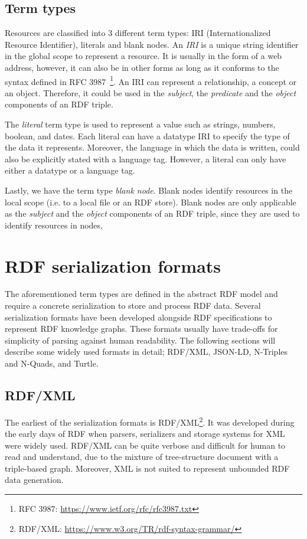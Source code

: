 \subsection{Term types}
Resources are classified into 3 different term types: IRI (Internationalized Resource Identifier),
literals and blank nodes. An \textit{IRI} is a unique string identifier in the global scope to
represent a resource. It is usually in the form of a web address, however, it can
also be in other forms as long as it conforms to the syntax defined in
RFC 3987~\footnote{RFC 3987: \url{https://www.ietf.org/rfc/rfc3987.txt}}.
An IRI can represent a relationship, a concept or an object. Therefore, it could be
used in the \textit{subject}, the \textit{predicate} and the \textit{object} components of
an RDF triple.

The \textit{literal} term type is used to represent a value such as strings, numbers, boolean, and dates.
Each literal can have a datatype IRI to specify the type of the data it represents. Moreover, the
language in which the data is written, could also be explicitly stated with
a language tag. However, a literal can only have either a datatype or a language tag. 

Lastly, we have the term type \textit{blank node}. Blank nodes identify resources
in the local scope (i.e. to a local file or an RDF store).
Blank nodes are only applicable as the \textit{subject}
and the \textit{object} components of an RDF triple, since they are used to
identify resources in nodes,


\section{RDF serialization formats}

The aforementioned term types are defined in the abstract RDF model and 
require a concrete serialization to store and process RDF data. 
Several serialization formats have been developed alongside RDF specifications to represent RDF
knowledge graphs.
These formats usually have trade-offs for simplicity of parsing against 
human readability. The following sections will describe some widely used formats in detail; 
RDF/XML, JSON-LD, N-Triples and N-Quads, and Turtle. 


\subsection{RDF/XML}
The earliest of the serialization formats is RDF/XML\footnote{RDF/XML: \url{https://www.w3.org/TR/rdf-syntax-grammar/}}. 
It was developed during the early days of RDF when parsers, serializers and storage systems 
for XML were widely used. 
RDF/XML can be quite verbose and difficult for human to read and understand, 
due to the mixture of tree-structure document with a triple-based graph. 
Moreover, XML is not suited to represent unbounded RDF data generation.



